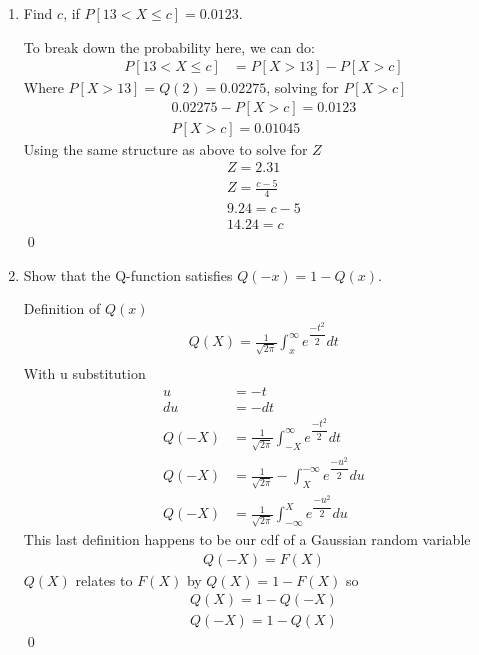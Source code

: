 \documentclass[11pt]{article}
\begin{document}
\begin{enumerate}[label=(\alph*)]
    \item Find $c$, if $P[13 < X \leq c] = 0.0123$.
    \begin{solution}
        To break down the probability here, we can do:
        \begin{align*}
            P[13 < X \leq c] &= P[X > 13] - P[X > c]
        \end{align*}
        Where $P[X > 13] = Q(2) = 0.02275$, solving for $P[X > c]$
        \begin{align*}
            0.02275 - P[X > c] = 0.0123 \\
            P[X > c] = 0.01045
        \end{align*}
        Using the same structure as above to solve for $Z$
        \begin{align*}
            Z = 2.31 \\
            Z = \frac{c - 5}{4} \\
            9.24 = c - 5 \\
            14.24 = c
        \end{align*}
        \qed
    \end{solution}

    \vspace{3em}

    \item Show that the Q-function satisfies $Q(-x) = 1 - Q(x)$.
    \begin{solution}
        Definition of $Q(x)$
        \begin{align*}
            Q(X) = \frac{1}{\sqrt{2\pi}} \int_{x}^{\infty} e^{\dfrac{-t^2}{2}} dt \\[1em]
        \end{align*}
        With u substitution
        \begin{align*}
            u &= -t \\
            du &= -dt \\
            Q(-X) &= \frac{1}{\sqrt{2\pi}} \int_{-X}^{\infty} e^{\dfrac{-t^2}{2}} dt \\
            Q(-X) &= \frac{1}{\sqrt{2\pi}} -\int_{X}^{-\infty} e^{\dfrac{-u^2}{2}} du \\
            Q(-X) &= \frac{1}{\sqrt{2\pi}} \int_{-\infty}^{X} e^{\dfrac{-u^2}{2}} du
        \end{align*}
        This last definition happens to be our cdf of a Gaussian random variable
        \begin{align*}
            Q(-X) = F(X)
        \end{align*}
        $Q(X)$ relates to $F(X)$ by $Q(X) = 1 - F(X)$ so
        \begin{align*}
            Q(X) = 1 - Q(-X) \\
            Q(-X) = 1 - Q(X)
        \end{align*}
        \qed
    \end{solution}

    \vspace{3em}

\end{enumerate}
\end{document}
